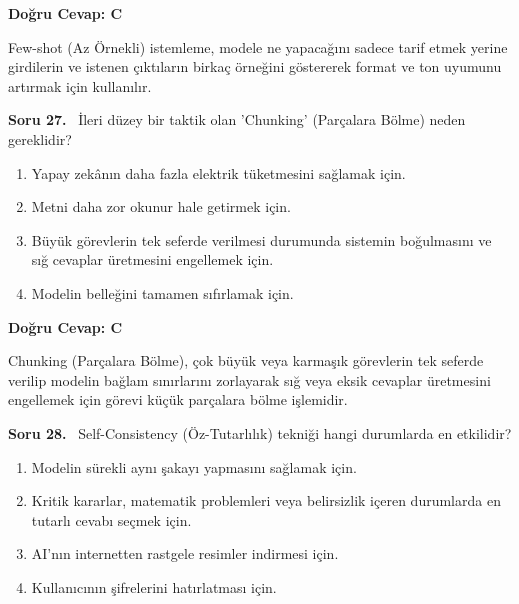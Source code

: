\documentclass[11pt,a4paper,openany]{book}
\begin{document}
\vspace{4pt}
\begin{tcolorbox}[title=Cevap ve Açıklama, colback=gray!3!white, colframe=primarycolor!90!black, arc=2mm, fonttitle=\bfseries\sffamily, top=6pt, bottom=6pt]
    \textbf{Doğru Cevap: C}

    \vspace{2pt}
    Few-shot (Az Örnekli) istemleme, modele ne yapacağını sadece tarif etmek yerine girdilerin ve istenen çıktıların birkaç örneğini göstererek format ve ton uyumunu artırmak için kullanılır.
\end{tcolorbox}
\vspace{10pt}
\needspace{5cm}
\vspace{8pt}
\noindent\textbf{\large\sffamily Soru 27.} \ İleri düzey bir taktik olan 'Chunking' (Parçalara Bölme) neden gereklidir?

\begin{enumerate}[label=\Alph*), leftmargin=25pt, topsep=4pt, itemsep=2pt]
        \item Yapay zekânın daha fazla elektrik tüketmesini sağlamak için.
        \item Metni daha zor okunur hale getirmek için.
        \item Büyük görevlerin tek seferde verilmesi durumunda sistemin boğulmasını ve sığ cevaplar üretmesini engellemek için.
        \item Modelin belleğini tamamen sıfırlamak için.
\end{enumerate}

\vspace{4pt}
\begin{tcolorbox}[title=Cevap ve Açıklama, colback=gray!3!white, colframe=primarycolor!90!black, arc=2mm, fonttitle=\bfseries\sffamily, top=6pt, bottom=6pt]
    \textbf{Doğru Cevap: C}

    \vspace{2pt}
    Chunking (Parçalara Bölme), çok büyük veya karmaşık görevlerin tek seferde verilip modelin bağlam sınırlarını zorlayarak sığ veya eksik cevaplar üretmesini engellemek için görevi küçük parçalara bölme işlemidir.
\end{tcolorbox}
\vspace{10pt}
\needspace{5cm}
\vspace{8pt}
\noindent\textbf{\large\sffamily Soru 28.} \ Self-Consistency (Öz-Tutarlılık) tekniği hangi durumlarda en etkilidir?

\begin{enumerate}[label=\Alph*), leftmargin=25pt, topsep=4pt, itemsep=2pt]
        \item Modelin sürekli aynı şakayı yapmasını sağlamak için.
        \item Kritik kararlar, matematik problemleri veya belirsizlik içeren durumlarda en tutarlı cevabı seçmek için.
        \item AI'nın internetten rastgele resimler indirmesi için.
        \item Kullanıcının şifrelerini hatırlatması için.
\end{enumerate}
\end{document}
